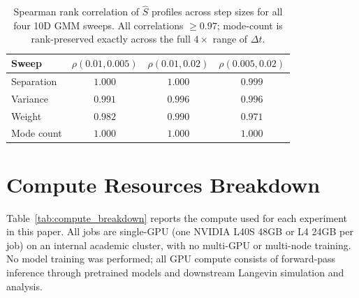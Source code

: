 \documentclass{article}
\begin{document}
\begin{table}[H]
\centering
\caption{  Spearman rank correlation of $\hat S$ profiles across
step sizes for all four 10D GMM sweeps. All correlations $\ge 0.97$;
mode-count is rank-preserved exactly across the full $4\times$ range
of $\Delta t$.}
\label{tab:dt_robustness}
 
\begin{tabular}{@{}lccc@{}}
\toprule
Sweep & $\rho(0.01, 0.005)$ & $\rho(0.01, 0.02)$ & $\rho(0.005, 0.02)$ \\
\midrule
Separation & $1.000$ & $1.000$ & $0.999$ \\
Variance   & $0.991$ & $0.996$ & $0.996$ \\
Weight     & $0.982$ & $0.990$ & $0.971$ \\
Mode count & $1.000$ & $1.000$ & $1.000$ \\
\bottomrule
\end{tabular}
\end{table}
\clearpage

\section{Compute Resources Breakdown}
\label{app:compute}

Table~\ref{tab:compute_breakdown} reports the compute used for each
experiment in this paper. All jobs are single-GPU (one NVIDIA L40S
48GB or L4 24GB per job) on an internal academic cluster, with no
multi-GPU or multi-node training. No model training was performed;
all GPU compute consists of forward-pass inference through pretrained
models and downstream Langevin simulation and analysis.
\end{document}

